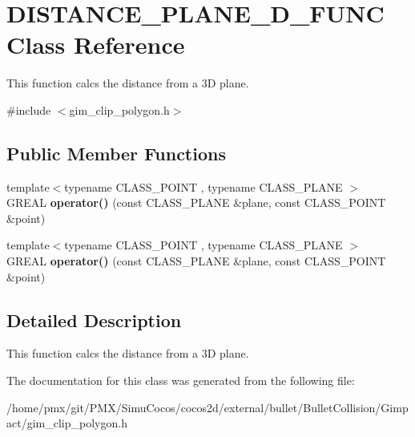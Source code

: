 \hypertarget{classDISTANCE__PLANE__3D__FUNC}{}\section{D\+I\+S\+T\+A\+N\+C\+E\+\_\+\+P\+L\+A\+N\+E\+\_\+D\+\_\+\+F\+U\+NC Class Reference}
\label{classDISTANCE__PLANE__3D__FUNC}


This function calcs the distance from a 3D plane.  




{\ttfamily \#include $<$gim\+\_\+clip\+\_\+polygon.\+h$>$}

\subsection*{Public Member Functions}
\begin{DoxyCompactItemize}
\item 
\mbox{\label{classDISTANCE__PLANE__3D__FUNC_a74c4f415c83fe6dd0665188b344dccdd}} 
{\footnotesize template$<$typename C\+L\+A\+S\+S\+\_\+\+P\+O\+I\+NT , typename C\+L\+A\+S\+S\+\_\+\+P\+L\+A\+NE $>$ }\\G\+R\+E\+AL {\bfseries operator()} (const C\+L\+A\+S\+S\+\_\+\+P\+L\+A\+NE \&plane, const C\+L\+A\+S\+S\+\_\+\+P\+O\+I\+NT \&point)
\item 
\mbox{\label{classDISTANCE__PLANE__3D__FUNC_a74c4f415c83fe6dd0665188b344dccdd}} 
{\footnotesize template$<$typename C\+L\+A\+S\+S\+\_\+\+P\+O\+I\+NT , typename C\+L\+A\+S\+S\+\_\+\+P\+L\+A\+NE $>$ }\\G\+R\+E\+AL {\bfseries operator()} (const C\+L\+A\+S\+S\+\_\+\+P\+L\+A\+NE \&plane, const C\+L\+A\+S\+S\+\_\+\+P\+O\+I\+NT \&point)
\end{DoxyCompactItemize}


\subsection{Detailed Description}
This function calcs the distance from a 3D plane. 

The documentation for this class was generated from the following file\+:\begin{DoxyCompactItemize}
\item 
/home/pmx/git/\+P\+M\+X/\+Simu\+Cocos/cocos2d/external/bullet/\+Bullet\+Collision/\+Gimpact/gim\+\_\+clip\+\_\+polygon.\+h\end{DoxyCompactItemize}
